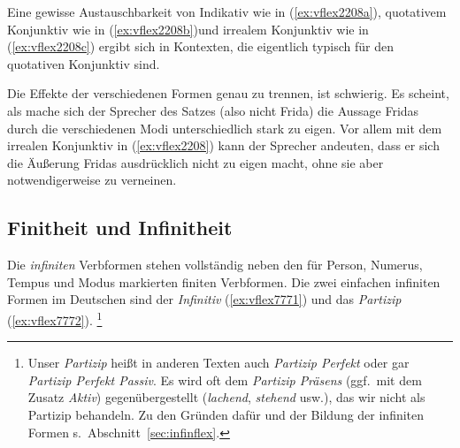 
Eine gewisse Austauschbarkeit von Indikativ wie in (\ref{ex:vflex2208a}), quotativem Konjunktiv wie in (\ref{ex:vflex2208b})und irrealem Konjunktiv wie in (\ref{ex:vflex2208c}) ergibt sich in Kontexten, die eigentlich typisch für den quotativen Konjunktiv sind.

\begin{exe}
  \ex\label{ex:vflex2208}
  \begin{xlist}
  \end{xlist}
\end{exe}

Die Effekte der verschiedenen Formen genau zu trennen, ist schwierig.
Es scheint, als mache sich der Sprecher des Satzes (also nicht Frida) die Aussage Fridas durch die verschiedenen Modi unterschiedlich stark zu eigen.
Vor allem mit dem irrealen Konjunktiv in (\ref{ex:vflex2208}) kann der Sprecher andeuten, dass er sich die Äußerung Fridas ausdrücklich nicht zu eigen macht, ohne sie aber notwendigerweise zu verneinen.

\subsection{Finitheit und Infinitheit}

\label{sec:finit}


Die \textit{infiniten} Verbformen stehen vollständig neben den für Person, Numerus, Tempus und Modus markierten finiten Verbformen. 
Die zwei einfachen infiniten Formen im Deutschen sind der \textit{Infinitiv} (\ref{ex:vflex7771}) und das \textit{Partizip} (\ref{ex:vflex7772}).%
\footnote{Unser \textit{Partizip} heißt in anderen Texten auch \textit{Partizip Perfekt} oder gar \textit{Partizip Perfekt Passiv}.
Es wird oft dem \textit{Partizip Präsens} (ggf.\ mit dem Zusatz \textit{Aktiv}) gegenübergestellt (\textit{lachend}, \textit{stehend} usw.), das wir nicht als Partizip behandeln.
Zu den Gründen dafür und der Bildung der infiniten Formen s.\ Abschnitt~\ref{sec:infinflex}.}

